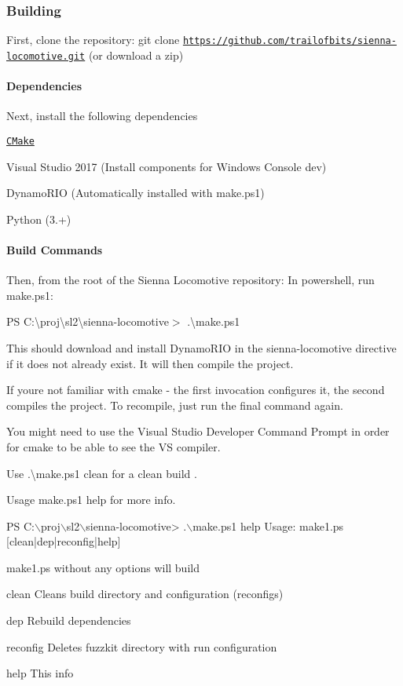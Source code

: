 \subsubsection*{Building}

First, clone the repository\+: {\ttfamily git clone \href{https://github.com/trailofbits/sienna-locomotive.git}{\tt https\+://github.\+com/trailofbits/sienna-\/locomotive.\+git}} (or download a zip)

\paragraph*{Dependencies}

Next, install the following dependencies
\begin{DoxyItemize}
\item \href{https://cmake.org/download/}{\tt C\+Make}
\item Visual Studio 2017 (Install components for Windows Console dev)
\item Dynamo\+R\+IO (Automatically installed with make.\+ps1)
\item Python (3.+)
\end{DoxyItemize}

\paragraph*{Build Commands}

Then, from the root of the Sienna Locomotive repository\+: In powershell, run make.\+ps1\+:

{\ttfamily PS C\+:\textbackslash{}proj\textbackslash{}sl2\textbackslash{}sienna-\/locomotive$>$ .\textbackslash{}make.\+ps1}

This should download and install Dynamo\+R\+IO in the sienna-\/locomotive directive if it does not already exist. It will then compile the project.

If you\textquotesingle{}re not familiar with cmake -\/ the first invocation configures it, the second compiles the project. To recompile, just run the final command again.

You might need to use the Visual Studio Developer Command Prompt in order for cmake to be able to see the VS compiler.

Use {\ttfamily .\textbackslash{}make.\+ps1 clean} for a clean build .

Usage {\ttfamily make.\+ps1 help} for more info.


\begin{DoxyCode}
PS C:\(\backslash\)proj\(\backslash\)sl2\(\backslash\)sienna-locomotive> .\(\backslash\)make.ps1 help
Usage: make1.ps [clean|dep|reconfig|help]

make1.ps without any options will build

clean
    Cleans build directory and configuration (reconfigs)

dep
    Rebuild dependencies

reconfig
    Deletes fuzzkit directory with run configuration

help
    This info
\end{DoxyCode}


